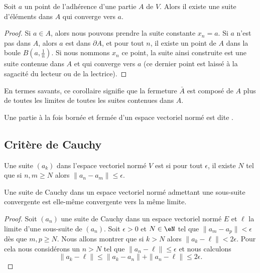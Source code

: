 \begin{corollary}		\label{CorAdhEstLim}
	Soit $a$ un point de l'adhérence d'une partie $A$ de $V$. Alors il existe une suite d'éléments dans $A$ qui converge vers $a$.
\end{corollary}

\begin{proof}
	Si $a\in A$, alors nous pouvons prendre la suite constante $x_n=a$. Si $a$ n'est pas dans $A$, alors $a$ est dans $\partial A$, et pour tout $n$, il existe un point de $A$ dans la boule $B(a,\frac{1}{ n })$. Si nous nommons $x_n$ ce point, la suite ainsi construite est une suite contenue dans $A$ et qui converge vers $a$ (ce dernier point est laissé à la sagacité du lecteur ou de la lectrice).
\end{proof}

En termes savants, ce corollaire signifie que la fermeture $\bar A$ est composé de $A$ plus de toutes les limites de toutes les suites contenues dans $A$.

\begin{definition}
	Une partie à la fois bornée et fermée d'un espace vectoriel normé est dite .
\end{definition}

\subsection{Critère de Cauchy}

\begin{definition}
    Une suite \( (a_k)\) dans l'espace vectoriel normé \( V\) est  si pour tout \( \epsilon\), il existe \( N\) tel que si \( n,m\geq N\) alors \( \| a_n-a_m \|\leq \epsilon\).
\end{definition}

\begin{lemma}
    Une suite de Cauchy dans un espace vectoriel normé admettant une sous-suite convergente est elle-même convergente vers la même limite.
\end{lemma}

\begin{proof}
    Soit \( (a_n)\) une suite de Cauchy dans un espace vectoriel normé \( E\) et \( \ell\) la limite d'une sous-suite de \( (a_n)\). Soit \( \epsilon>0\) et \( N\in \eN\) tel que \( \| a_m-a_p \|<\epsilon\) dès que \( m,p\geq N\). Nous allons montrer que si \( k>N\) alors \( \| a_k-\ell \|<2\epsilon\). Pour cela nous considérons un \( n>N\) tel que \( \| a_n-\ell \|\leq \epsilon\) et nous calculons
    \begin{equation}
        \| a_k-\ell \|\leq \| a_k-a_n \|+\| a_n-\ell \|\leq 2\epsilon.
    \end{equation}
\end{proof}

